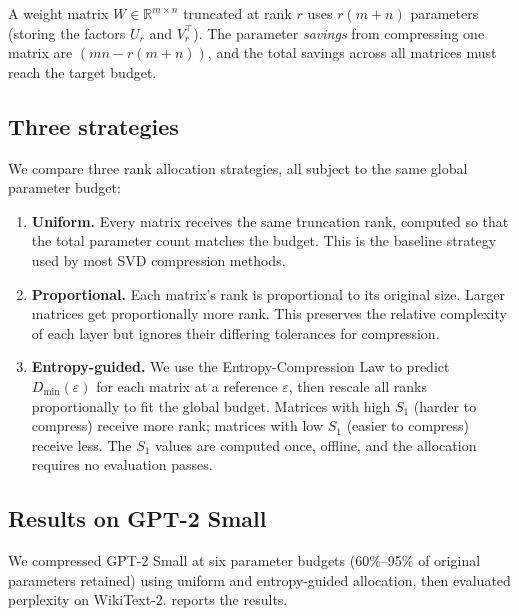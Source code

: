 \documentclass[11pt,a4paper]{article}
\newcommand{\Dmin}{D_{\min}}
\newcommand{\Svn}{S_1}
\begin{document}
A weight matrix $W \in \mathbb{R}^{m \times n}$ truncated at rank
$r$ uses $r(m + n)$ parameters (storing the factors $U_r$ and
$V_r^\top$).  The parameter \emph{savings} from compressing one
matrix are $(mn - r(m+n))$, and the total savings across all
matrices must reach the target budget.

\subsection{Three strategies}
\label{sec:comp-strategies}

We compare three rank allocation strategies, all subject to the same
global parameter budget:

\begin{enumerate}[leftmargin=2em, itemsep=3pt]
  \item \textbf{Uniform.}
    Every matrix receives the same truncation rank, computed so that
    the total parameter count matches the budget.  This is the
    baseline strategy used by most SVD compression methods.

  \item \textbf{Proportional.}
    Each matrix's rank is proportional to its original size.  Larger
    matrices get proportionally more rank.  This preserves the
    relative complexity of each layer but ignores their differing
    tolerances for compression.

  \item \textbf{Entropy-guided.}
    We use the Entropy-Compression Law to predict
    $\Dmin(\varepsilon)$ for each matrix at a reference $\varepsilon$,
    then rescale all ranks proportionally to fit the global budget.
    Matrices with high $\Svn$ (harder to compress) receive more rank;
    matrices with low $\Svn$ (easier to compress) receive less.  The
    $\Svn$ values are computed once, offline, and the allocation
    requires no evaluation passes.
\end{enumerate}

\subsection{Results on GPT-2 Small}
\label{sec:comp-results}

We compressed GPT-2 Small at six parameter budgets (60\%--95\% of
original parameters retained) using uniform and entropy-guided
allocation, then evaluated perplexity on WikiText-2.
 reports the results.
\end{document}
